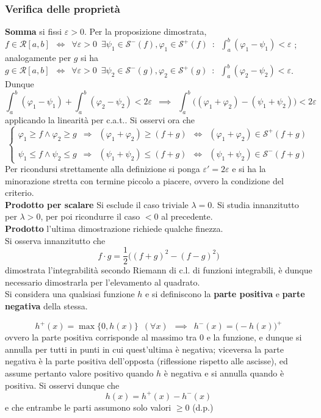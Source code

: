 \documentclass[10pt, oneside]{book}
\theoremstyle{plain}
\begin{document}
\subsubsection*{Verifica delle proprietà}
\textbf{Somma} si fissi $\varepsilon > 0$. Per la proposizione dimostrata, $f \in \mathcal{R}[a,b] \enspace \Leftrightarrow \enspace \forall \varepsilon > 0 \enspace \exists \psi_1 \in \mathcal{S}^-(f) , \varphi_1 \in \mathcal{S}^+(f) \enspace : \enspace \int_a^b (\varphi_1 - \psi_1) < \varepsilon$ ; analogamente per $g$ si ha $g \in \mathcal{R}[a,b] \enspace \Leftrightarrow \enspace \forall \varepsilon > 0 \enspace \exists \psi_2 \in \mathcal{S}^-(g) , \varphi_2 \in \mathcal{S}^+(g) \enspace : \enspace \int_a^b (\varphi_2 - \psi_2) < \varepsilon$. Dunque 
\[\int_a^b (\varphi_1 - \psi_1) + \int_a^b (\varphi_2 - \psi_2) < 2\varepsilon \enspace \implies \enspace \int_a^b \big((\varphi_1 + \varphi_2) - (\psi_1 + \psi_2)\big) < 2\varepsilon\]
applicando la linearità per c.a.t.. Si osservi ora che 
\[\begin{cases}
    \varphi_1 \geq f \land \varphi_2 \geq g \enspace \Rightarrow \enspace (\varphi_1 + \varphi_2) \geq (f+g) \enspace \Leftrightarrow \enspace (\varphi_1 + \varphi_2) \in \mathcal{S}^+(f+g)\\
\\
    \psi_1 \leq f \land \psi_2 \leq g \enspace \Rightarrow \enspace (\psi_1 + \psi_2) \leq (f+g) \enspace \Leftrightarrow \enspace (\psi_1 + \psi_2) \in \mathcal{S}^-(f+g)
\end{cases}\]
Per ricondursi strettamente alla definizione si ponga $\varepsilon' = 2\varepsilon$ e si ha la minorazione stretta con termine piccolo a piacere, ovvero la condizione del criterio.
\\\textbf{Prodotto per scalare} Si esclude il caso triviale $\lambda = 0$. Si studia innanzitutto per $\lambda > 0$, per poi ricondurre il caso $< 0$ al precedente.
\\\textbf{Prodotto} l'ultima dimostrazione richiede qualche finezza.
\\Si osserva innanzitutto che 
\[f \cdot g = \frac{1}{2}\big((f+g)^2 - (f-g)^2\big)\]
dimostrata l'integrabilità secondo Riemann di c.l. di funzioni integrabili, è dunque necessario dimostrarla per l'elevamento al quadrato.
\\Si considera una qualsiasi funzione $h$ e si definiscono la \textbf{parte positiva} e \textbf{parte negativa} della stessa.
\begin{defin}
\[h^+(x) = \max\{0, h(x)\} \enspace (\forall x) \enspace \implies \enspace h^-(x) = \big(-h(x)\big)^+\]
ovvero la parte positiva corrisponde al massimo tra 0 e la funzione, e dunque si annulla per tutti in punti in cui quest'ultima è negativa; viceversa la parte negativa è la parte positiva dell'opposta (riflessione rispetto alle ascisse), ed assume pertanto valore positivo quando $h$ è negativa e si annulla quando è positiva. Si osservi dunque che
\[h(x) = h^+(x) - h^-(x)\]
e che entrambe le parti assumono solo valori $\geq 0$ (d.p.)
\end{defin}
\end{document}
